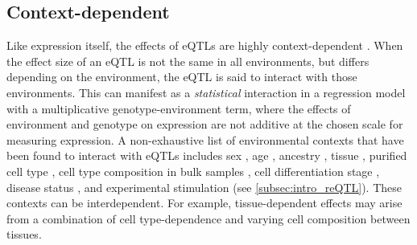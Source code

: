 \begin{outline}
\subsection{Context-dependent }
\label{subsec:intro_contextDependenteQTL}

Like expression itself, the effects of \glspl{eQTL} are highly context-dependent \autocite{albert2015RoleRegulatoryVariation,vandiedonck2017GeneticAssociationMolecular}.
When the effect size of an \gls{eQTL} is not the same in all environments, 
but differs depending on the environment, 
the \gls{eQTL} is said to interact with those environments.
This can manifest as a \textit{statistical} interaction in a regression model with a multiplicative genotype-environment term,
where the effects of environment and genotype on expression are not additive at the chosen scale for measuring expression.
A non-exhaustive list of environmental contexts that have been found to interact with \glspl{eQTL} includes
    sex \autocite{yao2014SexAgeinteractingEQTLs},
    age \autocite{yao2014SexAgeinteractingEQTLs},
    ancestry \autocite{dejager2015ImmVarProjectInsights,nedelec2016GeneticAncestryNatural,quach2017LivingAdaptiveWorld},
    tissue \autocite{nica2011ArchitectureGeneRegulatory,aguet2017GeneticEffectsGene},
    purified cell type \autocite{dimas2009CommonRegulatoryVariation,dejager2015ImmVarProjectInsights,peters2016InsightGenotypePhenotypeAssociations,chen2016GeneticDriversEpigenetic,calderon2019LandscapeStimulationresponsiveChromatin},
    cell type composition in bulk samples \autocite{westra2015CellSpecificEQTL,zhernakova2017IdentificationContextdependentExpression,glastonbury2019CellTypeHeterogeneityAdipose,kim-hellmuth2020CellTypeSpecific},
    cell differentiation stage \autocite{strober2019DynamicGeneticRegulation},
    disease status \autocite{peters2016InsightGenotypePhenotypeAssociations},
    and experimental stimulation (see \cref{subsec:intro_reQTL}).
These contexts can be interdependent.
For example, tissue-dependent effects may arise from a combination of cell type-dependence and varying cell composition between tissues.


\end{outline}
